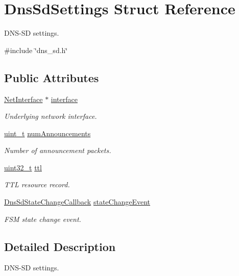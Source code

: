 \hypertarget{structDnsSdSettings}{}\section{Dns\+Sd\+Settings Struct Reference}
\label{structDnsSdSettings}


D\+N\+S-\/\+SD settings.  




{\ttfamily \#include \char`\"{}dns\+\_\+sd.\+h\char`\"{}}

\subsection*{Public Attributes}
\begin{DoxyCompactItemize}
\item 
\hyperlink{net_8h_a2234db8911a1148c9159979d8f5e0d6b}{Net\+Interface} $\ast$ \hyperlink{structDnsSdSettings_a44bec3533618076ff5b1695be49b873d}{interface}
\begin{DoxyCompactList}\small\item\em Underlying network interface. \end{DoxyCompactList}\item 
\hyperlink{compiler__port_8h_a12a1e9b3ce141648783a82445d02b58d}{uint\+\_\+t} \hyperlink{structDnsSdSettings_a0538afd7122031fbd37245a78655d878}{num\+Announcements}
\begin{DoxyCompactList}\small\item\em Number of announcement packets. \end{DoxyCompactList}\item 
\hyperlink{stdint_8h_a435d1572bf3f880d55459d9805097f62}{uint32\+\_\+t} \hyperlink{structDnsSdSettings_aff4d040c3aaa0aec91652624a1bd5e2d}{ttl}
\begin{DoxyCompactList}\small\item\em T\+TL resource record. \end{DoxyCompactList}\item 
\hyperlink{dns__sd_8h_aaac6c7f0600a0f8799c102efe1c65be4}{Dns\+Sd\+State\+Change\+Callback} \hyperlink{structDnsSdSettings_a6c414366d64ac6a010da9aa6b5b7ad20}{state\+Change\+Event}
\begin{DoxyCompactList}\small\item\em F\+SM state change event. \end{DoxyCompactList}\end{DoxyCompactItemize}


\subsection{Detailed Description}
D\+N\+S-\/\+SD settings. 

